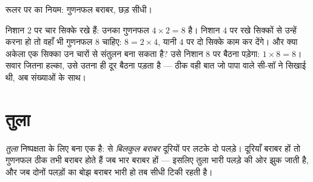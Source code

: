 \begin{omfigure}

{\small रूलर पर  का नियम: गुणनफल बराबर, छड़ सीधी।}
\end{omfigure}

\begin{example}[नियम को काम में लाना]\label{ex:g3:levers-and-scales:using}
निशान $2$ पर चार सिक्के रखे हैं: उनका गुणनफल $4 \times 2 = 8$ है।
निशान $4$ पर रखे सिक्कों से उन्हें  करना हो तो वहाँ भी गुणनफल
$8$ चाहिए: $8 = 2 \times 4$, यानी $4$ पर दो सिक्के काम कर देंगे।
और क्या अकेला एक सिक्का उन चारों से संतुलन बना सकता है? उसे निशान $8$
पर बैठना पड़ेगा: $1 \times 8 = 8$। सवार जितना हल्का, उसे उतना ही दूर
बैठना पड़ता है --- ठीक वही बात जो पापा वाले सी-सॉ ने सिखाई थी, अब
संख्याओं के साथ।
\end{example}

\section{तुला}

\begin{definition}[तुला]\label{def:g3:levers-and-scales:scale}
\emph{तुला} निष्पक्षता के लिए बना एक  है:  से
\emph{बिलकुल बराबर} दूरियों पर लटके दो पलड़े। दूरियाँ बराबर हों तो
गुणनफल ठीक तभी बराबर होते हैं जब भार बराबर हों --- इसलिए तुला भारी
पलड़े की ओर झुक जाती है, और जब दोनों पलड़ों का बोझ बराबर भारी हो तब
सीधी टिकी रहती है।
\end{definition}

